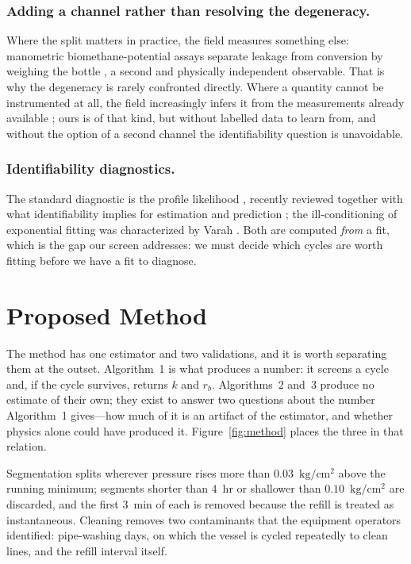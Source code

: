 \documentclass[runningheads]{llncs}
\newcommand{\pu}{\ensuremath{\mathrm{kg/cm^{2}}}}
\newcommand{\rb}{\ensuremath{r_{b}}}
\begin{document}
\subsubsection{Adding a channel rather than resolving the degeneracy.}
Where the split matters in practice, the field measures something else:
manometric biomethane-potential assays separate leakage from conversion
by weighing the bottle \cite{hafner2018quantification}, a second and
physically independent observable. That is why the degeneracy is rarely confronted directly. Where a
quantity cannot be instrumented at all, the field increasingly infers
it from the measurements already available
\cite{rutland2025application}; ours is of that kind, but without
labelled data to learn from, and without the option of a second
channel the identifiability question is unavoidable.

\subsubsection{Identifiability diagnostics.}
The standard diagnostic is the profile likelihood
\cite{raue2009structural}, recently reviewed together with what
identifiability implies for estimation and prediction
\cite{simpson2026parameter}; the ill-conditioning of exponential
fitting was characterized by Varah \cite{varah1985fitting}. Both are
computed \emph{from} a fit, which is the gap our screen addresses: we
must decide which cycles are worth fitting before we have a fit to
diagnose.

\section{Proposed Method}
\label{sec:method}

The method has one estimator and two validations, and it is worth
separating them at the outset. Algorithm~1 is what produces a number:
it screens a cycle and, if the cycle survives, returns $k$ and \rb{}.
Algorithms~2 and~3 produce no estimate of their own; they exist to
answer two questions about the number Algorithm~1 gives---how much of
it is an artifact of the estimator, and whether physics alone could
have produced it. Figure~\ref{fig:method} places the three in that
relation.

Segmentation splits wherever pressure rises more than $0.03$~\pu{}
above the running minimum; segments shorter than $4$~hr or shallower
than $0.10$~\pu{} are discarded, and the first $3$~min of each is
removed because the refill is treated as instantaneous. Cleaning
removes two contaminants that the equipment operators identified:
pipe-washing days, on which the vessel is cycled repeatedly to clean
lines, and the refill interval itself.
\end{document}
